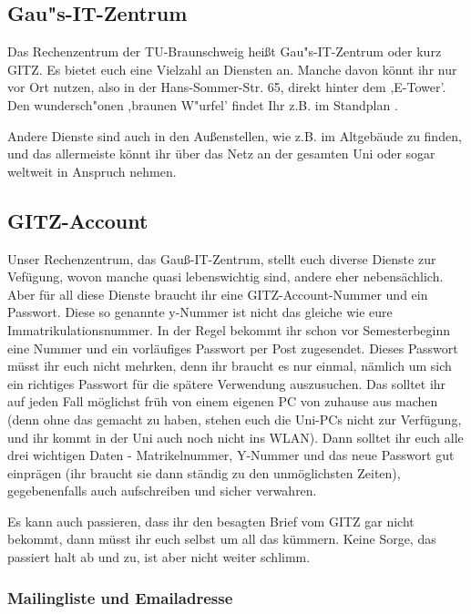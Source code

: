 \subsection{Gau"s-IT-Zentrum}
Das Rechenzentrum der TU-Braunschweig heißt Gau"s-IT-Zentrum oder kurz GITZ. Es bietet euch eine Vielzahl an Diensten an. Manche davon könnt ihr nur vor Ort nutzen, also in der Hans-Sommer-Str. 65, direkt hinter dem ,E-Tower'. Den wundersch"onen ,braunen W"urfel' findet Ihr z.B. im Standplan .

Andere Dienste sind auch in den Außenstellen, wie z.B. im Altgebäude zu finden, und das allermeiste könnt ihr über das Netz an der gesamten Uni oder sogar weltweit in Anspruch nehmen.

\subsection{GITZ-Account}
\label{todogitz}
Unser Rechenzentrum, das Gauß-IT-Zentrum, stellt euch diverse 
Dienste zur Vefügung, wovon manche quasi lebenswichtig sind, 
andere eher nebensächlich. Aber für all diese Dienste braucht 
ihr eine GITZ-Account-Nummer und ein Passwort. Diese so genannte 
y-Nummer ist nicht das gleiche wie eure Immatrikulationsnummer. 
In der Regel bekommt ihr schon vor Semesterbeginn eine Nummer 
und ein vorläufiges Passwort per Post zugesendet. Dieses 
Passwort müsst ihr euch nicht mehrken, denn ihr braucht es nur 
einmal, nämlich um sich ein richtiges Passwort für die spätere 
Verwendung auszusuchen. Das solltet ihr auf jeden Fall möglichst 
früh von einem eigenen PC von zuhause aus machen (denn ohne das 
gemacht zu haben, stehen euch die Uni-PCs nicht zur Verfügung, 
und ihr kommt in der Uni auch noch nicht ins WLAN). Dann solltet 
ihr euch alle drei wichtigen Daten - Matrikelnummer, Y-Nummer 
und das neue Passwort gut einprägen (ihr braucht sie dann 
ständig zu den unmöglichsten Zeiten), gegebenenfalls auch 
aufschreiben und sicher verwahren.

Es kann auch passieren, dass ihr den besagten Brief vom GITZ 
gar nicht bekommt, dann müsst ihr euch selbst um all das kümmern. 
Keine Sorge, das passiert halt ab und zu, ist aber nicht weiter 
schlimm.

\subsubsection{Mailingliste und Emailadresse}
\label{todomailing}

